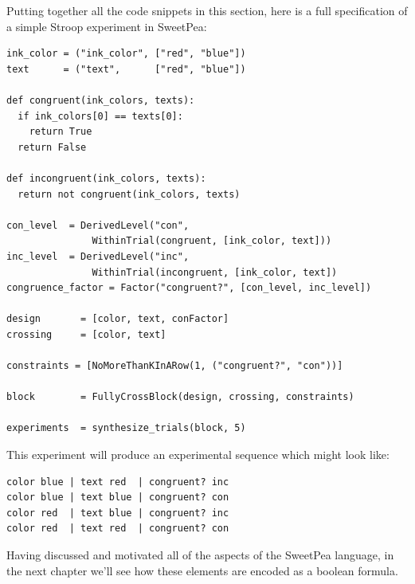 Putting together all the code snippets in this section, here is a full specification of a simple Stroop experiment in SweetPea:

\begin{verbatim}
ink_color = ("ink_color", ["red", "blue"])
text      = ("text",      ["red", "blue"])

def congruent(ink_colors, texts):
  if ink_colors[0] == texts[0]:
    return True
  return False

def incongruent(ink_colors, texts):
  return not congruent(ink_colors, texts)

con_level  = DerivedLevel("con",
               WithinTrial(congruent, [ink_color, text]))
inc_level  = DerivedLevel("inc",
               WithinTrial(incongruent, [ink_color, text])
congruence_factor = Factor("congruent?", [con_level, inc_level])

design       = [color, text, conFactor]
crossing     = [color, text]

constraints = [NoMoreThanKInARow(1, ("congruent?", "con"))]

block        = FullyCrossBlock(design, crossing, constraints)

experiments  = synthesize_trials(block, 5)
\end{verbatim}

This experiment will produce an experimental sequence which might look like:

\begin{verbatim}
color blue | text red  | congruent? inc
color blue | text blue | congruent? con
color red  | text blue | congruent? inc
color red  | text red  | congruent? con
\end{verbatim}

Having discussed and motivated all of the aspects of the SweetPea language, in the next chapter we'll see how these elements are encoded as a boolean formula.
